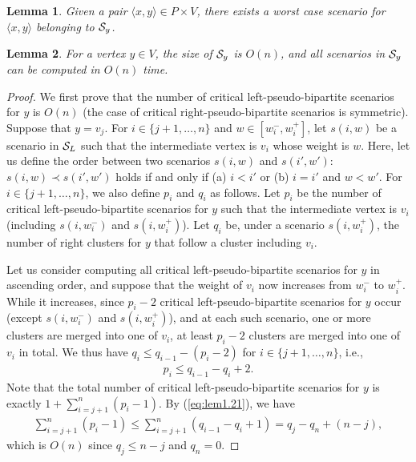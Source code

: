 \documentclass[a4paper]{llncs}
\newtheorem{lem}{Lemma}
\begin{document}
\begin{lem}
Given a pair $\langle x, y \rangle \in P \times V$, there exists a worst case scenario for $\langle x, y \rangle$ belonging to ${\cal S}_y$.
\label{lem:wcsxy2}
\end{lem}
\begin{lem}
For a vertex $y \in V$, 
the size of ${\cal S}_y$ is $O(n)$,
and all scenarios in ${\cal S}_y$ can be computed in $O(n)$ time.
\label{lem:csy}
\end{lem}
\begin{proof}
We first prove that 
the number of critical left-pseudo-bipartite scenarios for $y$ is $O(n)$
(the case of critical right-pseudo-bipartite scenarios is symmetric).
Suppose that $y = v_j$.
For $i \in \{j+1, \ldots, n\}$ and $w \in [w^-_i, w^+_i]$, let 
$s(i, w)$ be a scenario in ${\cal S}_L$
such that the intermediate vertex is $v_i$ whose weight is $w$.
Here, let us define the order between two scenarios $s(i, w)$ and $s(i', w')$:
$s(i, w) \prec s(i', w')$ holds if and only if 
(a) $i < i'$ or 
(b) $i = i'$ and $w < w'$. 
For $i \in \{j+1, \ldots, n\}$, we also define $p_i$ and $q_i$ as follows.
Let $p_i$ be the number of critical left-pseudo-bipartite scenarios for $y$ such that the intermediate vertex is $v_i$
(including $s(i, w^-_i)$ and $s(i, w^+_i)$).
Let $q_i$ be, under a scenario $s(i, w^+_i)$, the number of right clusters for $y$ that follow a cluster including $v_i$.



Let us consider computing all critical left-pseudo-bipartite scenarios for $y$ in ascending order,
and suppose that the weight of $v_i$ now increases from $w^-_i$ to $w^+_i$.
While it increases,
since $p_i-2$ critical left-pseudo-bipartite scenarios for $y$ occur (except $s(i, w^-_i)$ and $s(i, w^+_i)$),
and at each such scenario, one or more clusters are merged into one of $v_i$,
at least $p_i-2$ clusters are merged into one of $v_i$ in total.
We thus have $q_i \le q_{i-1} - (p_i-2)$ for $i \in \{j+1, \ldots, n\}$, i.e.,
\begin{eqnarray}
p_i \le q_{i-1} - q_i + 2.
\label{eq:lem1.21} 
\end{eqnarray}
Note that the total number of critical left-pseudo-bipartite scenarios for $y$ is exactly $1+\sum_{i=j+1}^n (p_i-1)$.
By (\ref{eq:lem1.21}), we have 
\begin{eqnarray}
\sum_{i=j+1}^n (p_i-1) \le \sum_{i=j+1}^n (q_{i-1} - q_i + 1) = q_j - q_n + (n-j),
\label{eq:lem1.22}
\end{eqnarray}
which is $O(n)$ since $q_j \le n-j$ and $q_n = 0$.


\end{proof}
\end{document}
